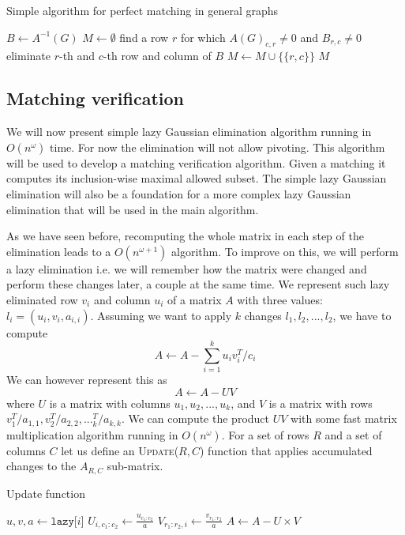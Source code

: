 \begin{algorithm}
\caption{Simple algorithm for perfect matching in general graphs}
\begin{algorithmic}[1]
\State $B \gets A^{-1}(G)$
\State $M \gets \emptyset$
        \State find a row $r$ for which $A(G)_{c,r}\not=0$ and $B_{r,c}\not=0$
        \State eliminate $r$-th and $c$-th row and column of $B$
        \State $M \gets M\cup\{\{r,c\}\}$
    \EndIf
\EndFor
\State \Return $M$
\EndFunction
\end{algorithmic}
\end{algorithm}

\subsection{Matching verification}
We will now present simple lazy Gaussian elimination algorithm running in $O(n^\omega)$ time.
For now the elimination will not allow pivoting.
This algorithm will be used to develop a matching verification algorithm.
Given a matching it computes its inclusion-wise maximal allowed subset.
The simple lazy Gaussian elimination will also be a foundation for a more complex lazy Gaussian elimination that will be used in the main algorithm.

As we have seen before, recomputing the whole matrix in each step of the elimination leads to a $O(n^{\omega+1})$ algorithm.
To improve on this, we will perform a lazy elimination i.e. we will remember how the matrix were changed and perform these changes later, a couple at the same time.
We represent such lazy eliminated row $v_i$ and column $u_i$ of a matrix $A$ with three values: $l_i = (u_i,v_i,a_{i,i})$.
Assuming we want to apply $k$ changes $l_1,l_2,...,l_2$, we have to compute
\[A \gets A - \sum_{i=1}^k u_i v_i^T/c_i\]
We can however represent this as
\[A \gets A - UV\]
where $U$ is a matrix with columns $u_1,u_2,...,u_k$, and $V$ is a matrix with rows $v_1^T/a_{1,1},v^T_2/a_{2,2},...^T_k/a_{k,k}$.
We can compute the product $UV$ with some fast matrix multiplication algorithm running in $O(n^\omega)$.
For a set of rows $R$ and a set of columns $C$ let us define an \textsc{Update}($R,C$) function that applies accumulated changes to the $A_{R,C}$ sub-matrix.


\begin{algorithm}
\caption{Update function}
\begin{algorithmic}[1]
    \State $u,v,a \gets \texttt{lazy[$i$]}$
    \State $U_{i,c_1:c_2} \gets \frac{u_{c_1:c_2}}{a}$
    \State $V_{r_1:r_2,i} \gets \frac{v_{r_1:r_2}}{a}$
\EndFor
\State $A \gets A - U\times V$
\EndFunction
\end{algorithmic}
\end{algorithm}

